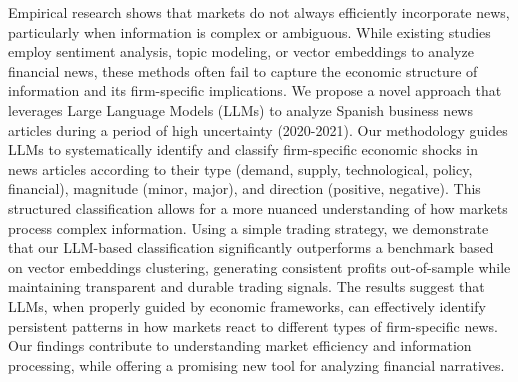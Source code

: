 Empirical research shows that markets do not always efficiently incorporate news, particularly when information is complex or ambiguous. While existing studies employ sentiment analysis, topic modeling, or vector embeddings to analyze financial news, these methods often fail to capture the economic structure of information and its firm-specific implications. We propose a novel approach that leverages Large Language Models (LLMs) to analyze Spanish business news articles during a period of high uncertainty (2020-2021). Our methodology guides LLMs to systematically identify and classify firm-specific economic shocks in news articles according to their type (demand, supply, technological, policy, financial), magnitude (minor, major), and direction (positive, negative). This structured classification allows for a more nuanced understanding of how markets process complex information. Using a simple trading strategy, we demonstrate that our LLM-based classification significantly outperforms a benchmark based on vector embeddings clustering, generating consistent profits out-of-sample while maintaining transparent and durable trading signals. The results suggest that LLMs, when properly guided by economic frameworks, can effectively identify persistent patterns in how markets react to different types of firm-specific news. Our findings contribute to understanding market efficiency and information processing, while offering a promising new tool for analyzing financial narratives.


